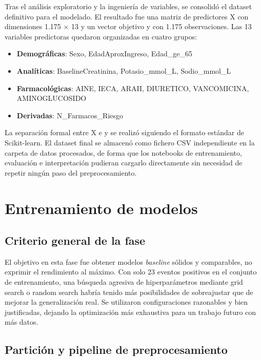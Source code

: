 \documentclass[12pt, a4paper, oneside]{report}
\begin{document}
Tras el análisis exploratorio y la ingeniería de variables, se consolidó el dataset definitivo para el modelado. El resultado fue una matriz de predictores X con dimensiones 1.175 × 13 y un vector objetivo y con 1.175 observaciones. Las 13 variables predictoras quedaron organizadas en cuatro grupos:

\begin{itemize}
    \item \textbf{Demográficas}: Sexo, EdadAproxIngreso, Edad\_ge\_65
    \item \textbf{Analíticas}: BaselineCreatinina, Potasio\_mmol\_L, Sodio\_mmol\_L
    \item \textbf{Farmacológicas}: AINE, IECA, ARAII, DIURETICO, VANCOMICINA, AMINOGLUCOSIDO
    \item \textbf{Derivadas}: N\_Farmacos\_Riesgo
\end{itemize}

La separación formal entre X e y se realizó siguiendo el formato estándar de Scikit-learn. El dataset final se almacenó como fichero CSV independiente en la carpeta de datos procesados, de forma que los notebooks de entrenamiento, evaluación e interpretación pudieran cargarlo directamente sin necesidad de repetir ningún paso del preprocesamiento.

\section{Entrenamiento de modelos}

\subsection{Criterio general de la fase}

El objetivo en esta fase fue obtener modelos \textit{baseline} sólidos y comparables, no exprimir el rendimiento al máximo. Con solo 23 eventos positivos en el conjunto de entrenamiento, una búsqueda agresiva de hiperparámetros mediante grid search o random search habría tenido más posibilidades de sobreajustar que de mejorar la generalización real. Se utilizaron configuraciones razonables y bien justificadas, dejando la optimización más exhaustiva para un trabajo futuro con más datos.

\subsection{Partición y pipeline de preprocesamiento}
\end{document}
